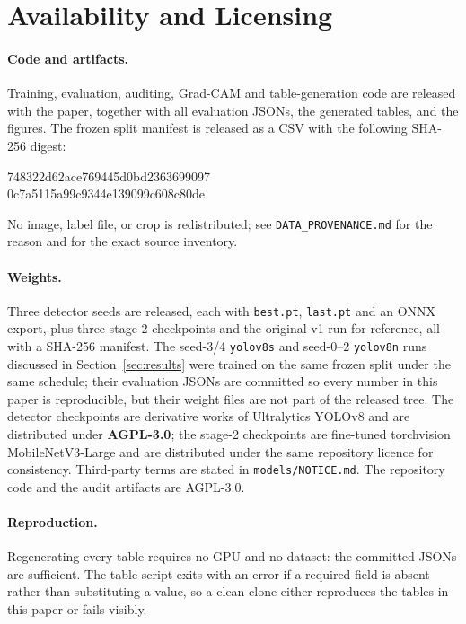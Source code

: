 \section{Availability and Licensing}
\label{sec:availability}

\paragraph{Code and artifacts.} Training, evaluation, auditing, Grad-CAM and
table-generation code are released with the paper, together with all evaluation
JSONs, the generated tables, and the figures. The frozen split manifest is
released as a CSV with the following SHA-256 digest:

\begin{center}\small\ttfamily
748322d62ace769445d0bd2363699097\\
0c7a5115a99c9344e139099c608c80de
\end{center}

\noindent No image, label file, or crop is redistributed; see
\texttt{DATA\_PROVENANCE.md} for the reason and for the exact source inventory.

\paragraph{Weights.} Three detector seeds are released, each with
\texttt{best.pt}, \texttt{last.pt} and an ONNX export, plus three stage-2
checkpoints and the original v1 run for reference, all with a SHA-256 manifest.
The seed-3/4 \texttt{yolov8s} and seed-0--2 \texttt{yolov8n} runs discussed in
Section~\ref{sec:results} were trained on the same frozen split under the same
schedule; their evaluation JSONs are committed so every number in this paper is
reproducible, but their weight files are not part of the released tree.
The detector checkpoints are derivative works of Ultralytics YOLOv8 and are
distributed under \textbf{AGPL-3.0}; the stage-2 checkpoints are fine-tuned
torchvision MobileNetV3-Large and are distributed under the same repository
licence for consistency. Third-party terms are stated in
\texttt{models/NOTICE.md}. The repository code and the audit artifacts are
AGPL-3.0.

\paragraph{Reproduction.} Regenerating every table requires no GPU and no
dataset: the committed JSONs are sufficient. The table script exits with an error
if a required field is absent rather than substituting a value, so a clean clone
either reproduces the tables in this paper or fails visibly.

